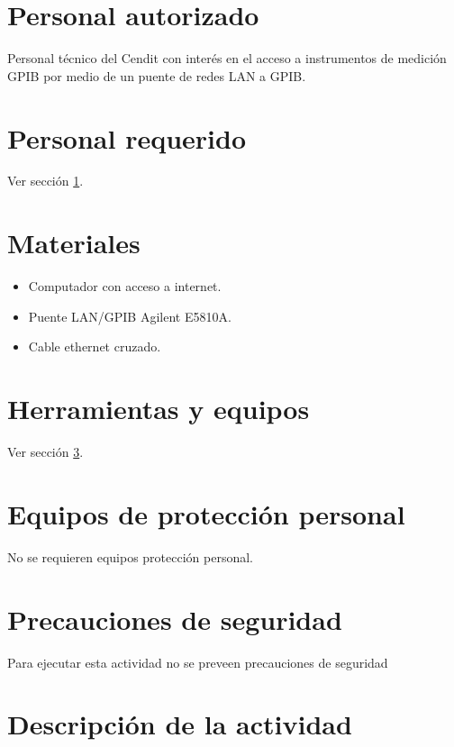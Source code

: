 \documentclass[paper=letter,oneside,fontsize=11pt, parskip=full]{scrartcl}
\begin{document}
	\section{Personal autorizado}	
		\label{Sec:PersonalAutorizado}		
		Personal técnico del Cendit con interés en el acceso a instrumentos de medición GPIB por medio de un puente de redes LAN a GPIB.
		
	\section{Personal requerido}	
		
		Ver sección \ref{Sec:PersonalAutorizado}.
		
	\section{Materiales}
	
		\label{Sec:SeccionMateriales}
		\begin{itemize}
			\item Computador con acceso a internet.
			\item Puente LAN/GPIB Agilent E5810A.
			\item Cable ethernet cruzado.
		\end{itemize}	
			
	\section{Herramientas y equipos}
		
		Ver sección \ref{Sec:SeccionMateriales}.

	
	\section{Equipos de protección personal}
	
		No se requieren equipos protección personal.
		
	\section{Precauciones de seguridad}
	
		Para ejecutar esta actividad no se preveen precauciones de seguridad
		
	\section{Descripción de la actividad}
	
\end{document}
